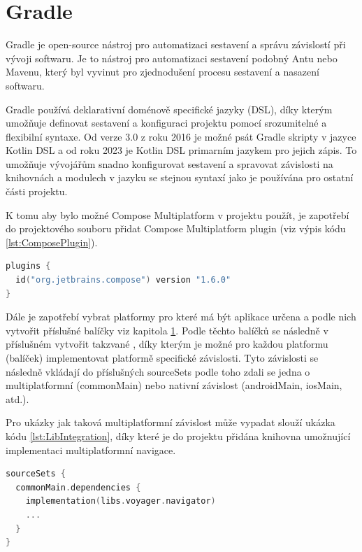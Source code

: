 \section{Gradle}
Gradle je open-source nástroj pro automatizaci sestavení a správu závislostí při vývoji softwaru. Je to nástroj pro automatizaci sestavení 
podobný Antu nebo Mavenu, který byl vyvinut pro zjednodušení procesu sestavení a nasazení softwaru.

Gradle používá deklarativní doménově specifické jazyky (DSL), díky kterým umožňuje definovat sestavení a konfiguraci projektu pomocí srozumitelné
a flexibilní syntaxe. Od verze 3.0 z roku 2016 je možné psát Gradle skripty v jazyce Kotlin DSL a od roku 2023 je Kotlin DSL primarním jazykem 
pro jejich zápis. To umožňuje vývojářům snadno konfigurovat sestavení a spravovat závislosti na knihovnách a modulech v jazyku se stejnou
syntaxí jako je používána pro ostatní části projektu.


K tomu aby bylo možné Compose Multiplatform v projektu použít, je zapotřebí do projektového souboru  přidat Compose 
Multiplatform plugin (viz výpis kódu \ref{lst:ComposePlugin}).

\begin{lstlisting}[caption={Integrace Compose Multiplatform pluginu do sestavovacího scriptu}, label={lst:ComposePlugin}, language=Kotlin]
plugins {
  id("org.jetbrains.compose") version "1.6.0"
}
\end{lstlisting}
Dále je zapotřebí vybrat platformy pro které má být aplikace určena a podle nich vytvořit příslušné balíčky viz kapitola \ref{}.
Podle těchto balíčků se následně v příslušném  vytvořit takzvané , díky kterým je možné
pro každou platformu (balíček) implementovat platformě specifické závislosti. Tyto závislosti se následně vkládají do příslušných
sourceSets podle toho zdali se jedna o multiplatformní (commonMain) nebo nativní závislost (androidMain, iosMain, atd.).

Pro ukázky jak taková multiplatformní závislost může vypadat slouží ukázka kódu \ref{lst:LibIntegration}, díky které je do projektu
přidána knihovna umožnující implementaci multiplatformní navigace.

\begin{lstlisting}[caption={Lib integration}, label={lst:LibIntegration}, language=Kotlin]
sourceSets {
  commonMain.dependencies {
    implementation(libs.voyager.navigator)
    ...
  }
}
\end{lstlisting}

